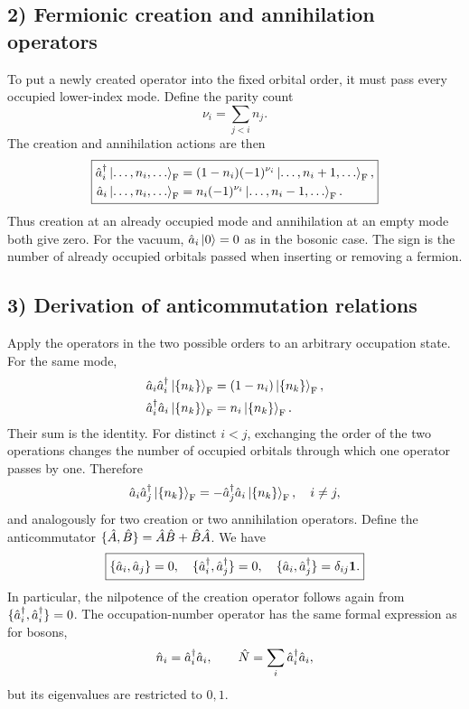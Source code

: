 \subsection*{2) Fermionic creation and annihilation operators}

To put a newly created operator into the fixed orbital order, it must pass every occupied lower-index mode. Define the parity count
\begin{equation}
\nu_i=\sum_{j<i}n_j.
\end{equation}
The creation and annihilation actions are then
\begin{equation}
\boxed{\begin{aligned}
\hat{a}_i^\dagger\left|\ldots,n_i,\ldots\right\rangle_{\mathrm F}
 &=(1-n_i)(-1)^{\nu_i}\left|\ldots,n_i+1,\ldots\right\rangle_{\mathrm F},\\
\hat{a}_i\left|\ldots,n_i,\ldots\right\rangle_{\mathrm F}
 &=n_i(-1)^{\nu_i}\left|\ldots,n_i-1,\ldots\right\rangle_{\mathrm F}.
\end{aligned}}
\end{equation}
Thus creation at an already occupied mode and annihilation at an empty mode both give zero. For the vacuum, $\hat{a}_i\left|0\right\rangle=0$ as in the bosonic case. The sign is the number of already occupied orbitals passed when inserting or removing a fermion.

\subsection*{3) Derivation of anticommutation relations}

Apply the operators in the two possible orders to an arbitrary occupation state. For the same mode,
\begin{equation}
\begin{aligned}
\hat{a}_i\hat{a}_i^\dagger\left|\{n_k\}\right\rangle_{\mathrm F}
 &=(1-n_i)\left|\{n_k\}\right\rangle_{\mathrm F},\\
\hat{a}_i^\dagger\hat{a}_i\left|\{n_k\}\right\rangle_{\mathrm F}
 &=n_i\left|\{n_k\}\right\rangle_{\mathrm F}.
\end{aligned}
\end{equation}
Their sum is the identity. For distinct $i<j$, exchanging the order of the two operations changes the number of occupied orbitals through which one operator passes by one. Therefore
\begin{equation}
\hat{a}_i\hat{a}_j^\dagger\left|\{n_k\}\right\rangle_{\mathrm F}
 =-\hat{a}_j^\dagger\hat{a}_i\left|\{n_k\}\right\rangle_{\mathrm F},\quad i\ne j,
\end{equation}
and analogously for two creation or two annihilation operators. Define the anticommutator $\{\hat{A},\hat{B}\}=\hat{A}\hat{B}+\hat{B}\hat{A}$. We have
\begin{equation}
\boxed{\{\hat{a}_i,\hat{a}_j\}=0,\quad
\{\hat{a}_i^\dagger,\hat{a}_j^\dagger\}=0,\quad
\{\hat{a}_i,\hat{a}_j^\dagger\}=\delta_{ij}\mathbf1.}
\end{equation}
In particular, the nilpotence of the creation operator follows again from $\{\hat{a}_i^\dagger,\hat{a}_i^\dagger\}=0$. The occupation-number operator has the same formal expression as for bosons,
\begin{equation}
\hat{n}_i=\hat{a}_i^\dagger\hat{a}_i,\qquad
\hat{N}=\sum_i\hat{a}_i^\dagger\hat{a}_i,
\end{equation}
but its eigenvalues are restricted to $0,1$.

